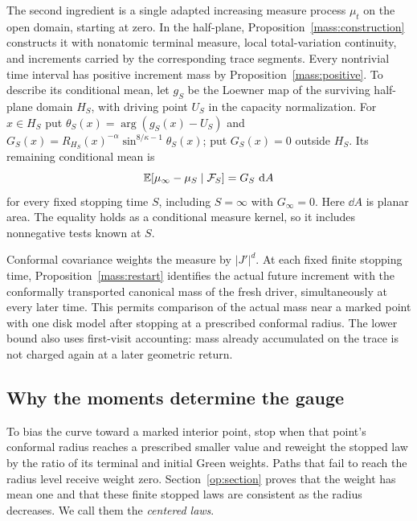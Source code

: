 The second ingredient is a single adapted increasing measure process
$\mu_t$ on the open domain, starting at zero. In the half-plane,
Proposition~\ref{mass:construction} constructs it with nonatomic terminal
measure, local total-variation continuity, and increments carried by the
corresponding trace segments. Every nontrivial time interval has positive
increment mass by Proposition~\ref{mass:positive}.
To describe its conditional mean, let $g_S$ be the Loewner map of the
surviving half-plane domain $H_S$, with driving point $U_S$ in the
capacity normalization. For $x\in H_S$ put
$\theta_S(x)=\arg(g_S(x)-U_S)$ and
$G_S(x)=R_{H_S}(x)^{-\alpha}\sin^{8/\kappa-1}\theta_S(x)$;
put $G_S(x)=0$ outside $H_S$. Its remaining conditional mean is
\[
 \mathbb E[\mu_\infty-\mu_S\mid\mathcal F_S]=G_S\,\mathop{}\!\mathrm{d} A
\]
for every fixed stopping time $S$, including $S=\infty$ with
$G_\infty=0$. Here $\dd A$ is planar area. The equality holds as a
conditional measure kernel, so it includes nonnegative tests known
at $S$.

Conformal covariance weights the measure by $|J'|^d$.
At each fixed finite stopping time, Proposition~\ref{mass:restart}
identifies the actual future increment with the conformally transported
canonical mass of the fresh driver, simultaneously at every later time.
This permits comparison of the actual mass near a marked point with
one disk model after stopping at a prescribed conformal radius.
The lower bound also uses first-visit accounting: mass already
accumulated on the trace is not charged again at a later geometric return.

\subsection{Why the moments determine the gauge}

To bias the curve toward a marked interior point, stop when that point's
conformal radius reaches a prescribed smaller value and reweight the
stopped law by the ratio of its terminal and initial Green weights.
Paths that fail to reach the radius level receive weight zero.
Section~\ref{op:section} proves that the weight has mean one and that
these finite stopped laws are consistent as the radius decreases.
We call them the \emph{centered laws}.

